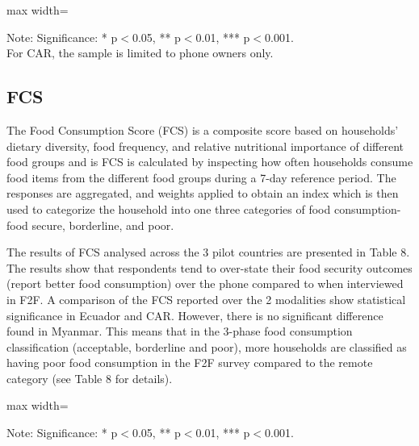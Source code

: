 \documentclass[11pt,harvard]{article}
\begin{document}
\begin{table}[htbp]
	\centering
	\begin{adjustbox}{max width=\textwidth}
		\begin{threeparttable}
			\caption{Impact of Indicator Composition: Paired rCARI-FES vs. rCARI-Inc in Remote Surveys}
			\scriptsize
			 
			\label{tab:Paired_RM_rCARI_FES_INC_All_Country}
			\begin{tablenotes}
				\item Note: Significance: * p$<$0.05, ** p$<$0.01, *** p$<$0.001. \\
				For CAR, the sample is limited to phone owners only.
			\end{tablenotes}
		\end{threeparttable}
	\end{adjustbox}
\end{table}

\clearpage

\subsection{FCS}

The Food Consumption Score (FCS) is a composite score based on households’ dietary diversity, food frequency, and relative nutritional importance of different food groups and is FCS is calculated by inspecting how often households consume food items from the different food groups during a 7-day reference period. The responses are aggregated, and weights applied to obtain an index which is then used to categorize the household into one three categories of food consumption-food secure, borderline, and poor.

The results of FCS analysed across the 3 pilot countries are presented in Table 8. The results show that respondents tend to over-state their food security outcomes (report better food consumption) over the phone compared to when interviewed in F2F. A comparison of the FCS reported over the 2 modalities show statistical significance in Ecuador and CAR. However, there is no significant difference found in Myanmar. 
This means that in the 3-phase food consumption classification (acceptable, borderline and poor), more households are classified as having poor food consumption in the F2F survey compared to the remote category (see Table 8 for details). 

	\begin{table}[htbp]
		\centering
		\begin{adjustbox}{max width=\textwidth}
			\begin{threeparttable}
				\caption{Impact of Survey Modality on Food Consumption Score and Groups}
				\scriptsize
				 
				\label{tab:FCS_Modality_All_Country}
				\begin{tablenotes}
					\item Note: Significance: * p$<$0.05, ** p$<$0.01, *** p$<$0.001. 
				\end{tablenotes}
			\end{threeparttable}
		\end{adjustbox}
	\end{table}
	
\end{document}
